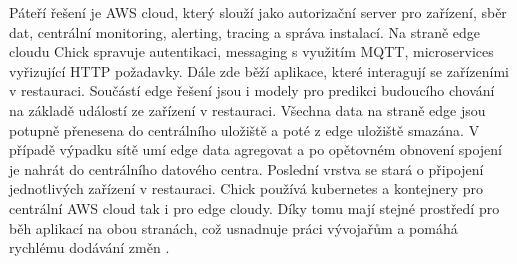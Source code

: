 	 Páteří řešení je AWS cloud, který slouží jako autorizační server pro zařízení, sběr dat, centrální monitoring, alerting, tracing a správa instalací. Na straně edge cloudu Chick spravuje autentikaci, messaging s využitím MQTT, microservices vyřizující HTTP požadavky. Dále zde běží aplikace, které interagují se zařízeními v restauraci. Součástí edge řešení jsou i modely pro predikci budoucího chování na základě událostí ze zařízení v restauraci. Všechna data na straně edge jsou potupně přenesena do centrálního uložiště a poté \linebreak z edge uložiště smazána. V případě výpadku sítě umí edge data agregovat a po opětovném obnovení spojení je nahrát do centrálního datového centra. Poslední vrstva se stará o připojení jednotlivých zařízení v restauraci. Chick používá kubernetes a kontejnery pro centrální AWS cloud tak i pro edge cloudy. Díky tomu mají stejné prostředí pro běh aplikací na obou stranách, což usnadnuje práci vývojařům a pomáhá rychlému dodávání změn \cite{chick-2}.

